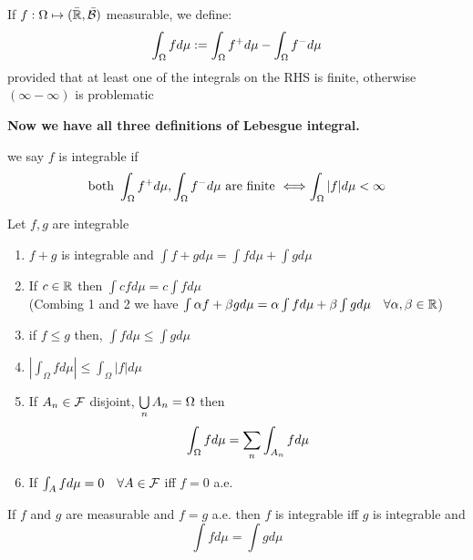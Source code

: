\begin{dfn}
If $f: \Omega \mapsto (\bar{\mathbb{R}}, \bar{\mathcal{B}})$ measurable, we define:
\begin{equation*}
    \int_{\Omega} fd\mu := \int_{\Omega} f^+ d\mu -\int_{\Omega} f^- d\mu
\end{equation*}provided that at least one of the integrals on the RHS is finite, otherwise $(\infty-\infty)$ is problematic
\end{dfn}
\textbf{Now we have all three definitions of Lebesgue integral.}
\vspace{0.5cm}
\begin{dfn}[Integrable] we say $f$ is integrable if
\begin{equation*}
    \text{both }\int_{\Omega} f^+ d\mu,\int_{\Omega} f^- d\mu \text{ are finite } \Longleftrightarrow \int_{\Omega} |f|d\mu < \infty
\end{equation*}
\end{dfn}
\begin{thm}[Properties]Let $f,g$ are integrable
\begin{enumerate}
    \item $f+g$ is integrable and $\int f+g d\mu = \int f d\mu +\int g d\mu$
    \item If $c\in\mathbb{R}$ then $\int cf d\mu = c\int f d\mu$ \\
    (Combing 1 and 2 we have $\int \alpha f+ \beta g d\mu = \alpha\int f d\mu +\beta\int g d\mu \quad \forall \alpha,\beta \in \mathbb{R}$)
    \item if $f\leq g$ then, $\int f d\mu \leq \int g d\mu$
    \item $|\int_{\Omega} f d\mu| \leq \int_{\Omega} |f| d\mu$
    \item If $A_n\in \mathcal{F}$ disjoint, $\bigcup\limits_{n}A_n = \Omega$ then
    \begin{equation*}
        \int_{\Omega} f d\mu = \sum\limits_{n} \int_{A_n} f d\mu
    \end{equation*}
    \item If $\int_{A} f d\mu=0 \quad \forall A\in \mathcal{F}$ iff $f = 0$ a.e.
\end{enumerate}
\end{thm}
\newpage
\begin{cor}\label{equalint}
If $f$ and $g$ are measurable and $f = g$ a.e. then $f$ is integrable iff $g$ is integrable and 
\begin{equation*}
    \int f d\mu = \int g d\mu
\end{equation*}
\end{cor}

